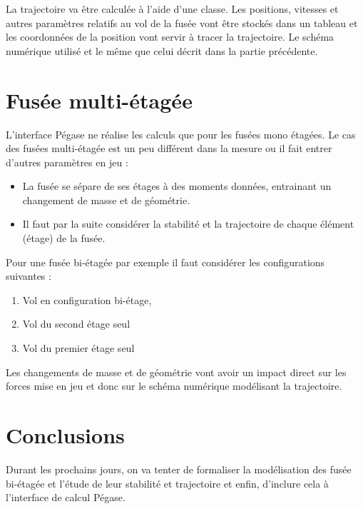 \documentclass[a4paper]{article}
\begin{document}
La trajectoire va être calculée à l'aide d'une classe. Les positions, vitesses et autres paramètres relatifs au vol de la fusée vont être stockés dans un tableau et les coordonnées de la position vont servir à tracer la trajectoire. Le schéma numérique utilisé et le même que celui décrit dans la partie précédente.



\section{Fusée multi-étagée}

L'interface Pégase ne réalise les calculs que pour les fusées mono étagées. Le cas des fusées multi-étagée est un peu différent dans la mesure ou il fait entrer d'autres paramètres en jeu : \\

\begin{itemize}
\item La fusée se sépare de ses étages à des moments données, entrainant un changement de masse et de géométrie.
\item Il faut par la suite considérer la stabilité et la trajectoire de chaque élément (étage) de la fusée.
\end{itemize}

Pour une fusée bi-étagée par exemple il faut considérer les configurations suivantes : 

\begin{enumerate}

\item[] Vol en configuration bi-étage,
\item[] Vol du second étage seul
\item[] Vol du premier étage seul

\end{enumerate}

Les changements de masse et de géométrie vont avoir un impact direct sur les forces mise en jeu et donc sur le schéma numérique modélisant la trajectoire.






\section{Conclusions}

Durant les prochains jours, on va tenter de formaliser la modélisation des fusée bi-étagée et l'étude de leur stabilité et trajectoire et enfin, d'inclure cela à l'interface de calcul Pégase.


%
%
\end{document}

